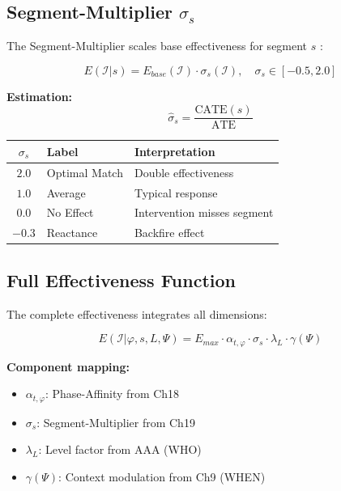 \subsection{Segment-Multiplier $\sigma_s$}

The Segment-Multiplier scales base effectiveness for segment $s$ \citep{bryan2021behavioural, szaszi2018systematic}:

\begin{equation}
\boxed{
E(\mathcal{I} | s) = E_{base}(\mathcal{I}) \cdot \sigma_s(\mathcal{I}), \quad \sigma_s \in [-0.5, 2.0]
}
\label{eq:mp-segment-multiplier}
\end{equation}

\textbf{Estimation:}
\begin{equation}
\hat{\sigma}_s = \frac{\text{CATE}(s)}{\text{ATE}}
\label{eq:mp-sigma-estimation}
\end{equation}

\begin{center}
\renewcommand{\arraystretch}{1.2}
\begin{tabular}{@{}cll@{}}
\toprule
\textbf{$\sigma_s$} & \textbf{Label} & \textbf{Interpretation} \\
\midrule
$2.0$ & Optimal Match & Double effectiveness \\
$1.0$ & Average & Typical response \\
$0.0$ & No Effect & Intervention misses segment \\
$-0.3$ & Reactance & Backfire effect \\
\bottomrule
\end{tabular}
\end{center}

\subsection{Full Effectiveness Function}

The complete effectiveness integrates all dimensions:

\begin{equation}
\boxed{
E(\mathcal{I} | \varphi, s, L, \Psi) = E_{max} \cdot \alpha_{t,\varphi} \cdot \sigma_s \cdot \lambda_L \cdot \gamma(\Psi)
}
\label{eq:mp-full-effectiveness}
\end{equation}

\textbf{Component mapping:}
\begin{itemize}[nosep]
\item $\alpha_{t,\varphi}$: Phase-Affinity from Ch18
\item $\sigma_s$: Segment-Multiplier from Ch19
\item $\lambda_L$: Level factor from AAA (WHO)
\item $\gamma(\Psi)$: Context modulation from Ch9 (WHEN)
\end{itemize}

